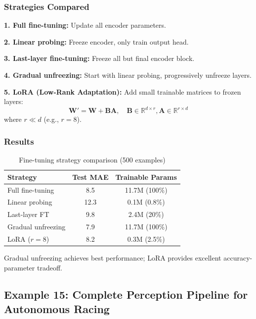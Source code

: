 \subsubsection{Strategies Compared}

\textbf{1. Full fine-tuning:}
Update all encoder parameters.

\textbf{2. Linear probing:}
Freeze encoder, only train output head.

\textbf{3. Last-layer fine-tuning:}
Freeze all but final encoder block.

\textbf{4. Gradual unfreezing:}
Start with linear probing, progressively unfreeze layers.

\textbf{5. LoRA (Low-Rank Adaptation):}
Add small trainable matrices to frozen layers:
\begin{equation}
\mathbf{W}' = \mathbf{W} + \mathbf{B}\mathbf{A}, \quad \mathbf{B} \in \mathbb{R}^{d \times r}, \mathbf{A} \in \mathbb{R}^{r \times d}
\label{eq:lora}
\end{equation}
where $r \ll d$ (e.g., $r = 8$).

\subsubsection{Results}

\begin{table}[htbp]
\centering
\caption{Fine-tuning strategy comparison (500 examples)}
\label{tab:finetuning}
\begin{tabular}{lcc}
\toprule
\textbf{Strategy} & \textbf{Test MAE} & \textbf{Trainable Params} \\
\midrule
Full fine-tuning & 8.5 & 11.7M (100\%) \\
Linear probing & 12.3 & 0.1M (0.8\%) \\
Last-layer FT & 9.8 & 2.4M (20\%) \\
Gradual unfreezing & 7.9 & 11.7M (100\%) \\
LoRA ($r=8$) & 8.2 & 0.3M (2.5\%) \\
\bottomrule
\end{tabular}
\end{table}

Gradual unfreezing achieves best performance; LoRA provides excellent accuracy-parameter tradeoff.


\subsection{Example 15: Complete Perception Pipeline for Autonomous Racing}

